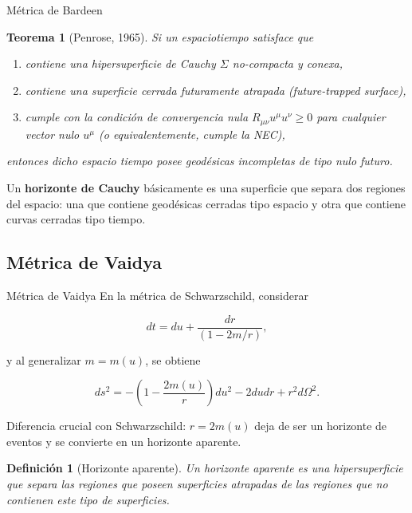 \documentclass[t]{beamer}
\numberwithin{equation}{section}
\newtheorem{definicion}{Definición}
\newtheorem{teorem}{Teorema}
\begin{document}
\begin{frame}{Métrica de Bardeen}
\begin{teorem}[Penrose, 1965]
\label{penrose sing thm}
Si un espaciotiempo satisface que

\begin{enumerate}[i]
\item contiene una hipersuperficie de Cauchy $\Sigma$ no-compacta y conexa,

\item contiene una superficie cerrada futuramente atrapada (future-trapped surface),

\item cumple con la condición de convergencia nula $R_{\mu \nu}u^{\mu}u^{\nu} \geq 0$ para cualquier vector nulo $u^{\mu}$ (o equivalentemente, cumple la NEC),
\end{enumerate}

entonces dicho espacio tiempo posee geodésicas incompletas de tipo nulo futuro.
\end{teorem}

Un \textbf{horizonte de Cauchy} básicamente es una superficie que separa dos regiones del espacio: una que contiene geodésicas cerradas tipo espacio y otra que contiene curvas cerradas tipo tiempo.
\end{frame}

\subsection{Métrica de Vaidya}

\begin{frame}{Métrica de Vaidya}
En la métrica de Schwarzschild, considerar

\begin{equation}
dt = du + \frac{dr}{(1 - 2m/r)},
\end{equation}

y al generalizar $m = m(u)$, se obtiene

\begin{equation}
\label{schw-tortoise}
ds^2 = - \left(1- \frac{2m(u)}{r}\right)du^2 - 2dudr + r^2d\Omega^2.
\end{equation}

%
%

Diferencia crucial con Schwarzschild: $r = 2m(u)$ deja de ser un horizonte de eventos y se convierte en un horizonte aparente.

\begin{definicion}[Horizonte aparente]
Un horizonte aparente es una hipersuperficie que separa las regiones que poseen superficies atrapadas de las regiones que no contienen este tipo de superficies.
\end{definicion}

\end{frame}
\end{document}
